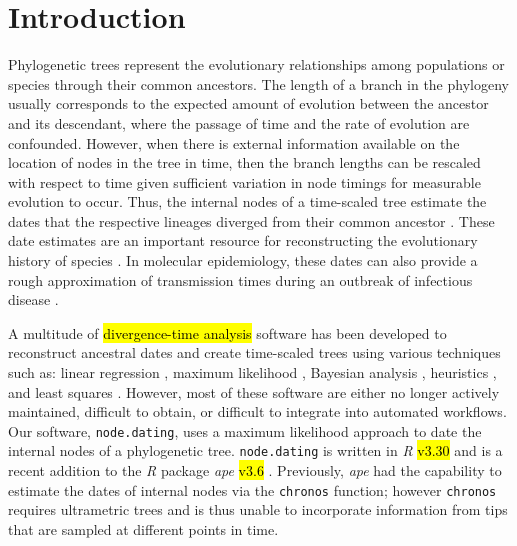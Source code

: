 \documentclass{bioinfo}
\newcommand{\code}[1]{{\tt #1}}
\newcommand{\edit}[1]{\hl{#1}}
\begin{document}
\vspace*{-25pt}

\section{Introduction} \label{sec:intro}
Phylogenetic trees represent the evolutionary relationships among populations or species through their common ancestors.  
The length of a branch in the phylogeny usually corresponds to the expected amount of evolution between the ancestor and its descendant, where the passage of time and the rate of evolution are confounded.
However, when there is external information available on the location of nodes in the tree in time, then the branch lengths can be rescaled with respect to time given sufficient variation in node timings for measurable evolution to occur.
Thus, the internal nodes of a time-scaled tree estimate the dates that the respective lineages diverged from their common ancestor \citep{Kumar16}.
These date estimates are an important resource for reconstructing the evolutionary history of species \citep{Shapiro04}.
In molecular epidemiology, these dates can also provide a rough approximation of transmission times during an outbreak of infectious disease 
\citep{Ypma13}.

A multitude of \edit{divergence-time analysis} software has been developed to reconstruct ancestral dates and create time-scaled trees using various techniques such as: linear regression \citep{Tempest}, maximum likelihood \citep{TipDates, r8ts, PAML}, Bayesian analysis \citep{BEAST}, heuristics \citep{UPGMA, TREBLE}, and least squares \citep{LSD}.
However, most of these software are either no longer actively maintained, difficult to obtain, or difficult to integrate into automated workflows.
Our software, \code{node.dating}, uses a maximum likelihood approach to date the internal nodes of a phylogenetic tree.
\code{node.dating} is written in \emph{R} \edit{v3.30} and is a recent addition to the \emph{R} package \emph{ape} \edit{v3.6} \citep{APE}.
Previously, \emph{ape} had the capability to estimate the dates of internal nodes via the \code{chronos} function; however \code{chronos} requires ultrametric trees and is thus unable to incorporate information from tips that are sampled at different points in time.
\end{document}
